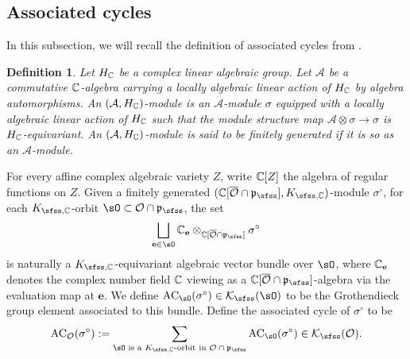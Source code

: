 \documentclass[12pt,a4paper]{amsart}
\newcommand{\CA}{{\mathcal {A}}}
\newcommand{\CK}{{\mathcal {K}}}
\newcommand{\CO}{{\mathcal {O}}}
\newcommand{\oS}{\operatorname{S}}
\newcommand{\p}{\mathfrak p}
\numberwithin{equation}{section}
\newtheorem{defn}[thm]{Definition}
\theoremstyle{remark}
\begin{document}
\subsection{Associated cycles}%

In this subsection, we will recall the definition of associated cycles from \cite{Vo89}.
\begin{defn}\label{spkmodule}
 Let $H_{\mathbb{C}}$ be a complex linear algebraic group. Let $\CA$ be a commutative $\mathbb{C}$-algebra carrying a locally algebraic linear action of $H_{\mathbb{C}}$ by algebra automorphisms.
  An $(\CA, H_\C)$-module is an  $\CA$-module
$
  \sigma
$
equipped with a locally algebraic linear action of $H_{\mathbb{C}}$ such that
the module structure map
$
  \CA\otimes \sigma\rightarrow \sigma
$
is $H_{\mathbb{C}}$-equivariant. An $(\CA, H_\C)$-module is said to be finitely generated if it is so as an $\CA$-module.

\end{defn}



For every affine complex algebraic variety $Z$, write $\mathbb{C}[Z]$ the algebra of regular functions on $Z$.
Given a finitely generated $(\C[\overline \CO\cap \p_\sfss], K_{\sfss, \C})$-module $\sigma^\circ$, for each $K_{\sfss, \C}$-orbit $\sO\subset \CO\cap \p_\sfss$, the set
\[
  \bigsqcup_{\mathbf e\in \sO} \C_\mathbf e\otimes_{\C[\overline \CO\cap \p_\sfss]}\sigma^\circ
\]
is naturally a $K_{\sfss, \C}$-equivariant algebraic vector bundle over $\sO$, where $\mathbb{C}_\mathbf e$  denotes the complex number field $\mathbb{C}$ viewing as a $\C[\overline \CO\cap \p_\sfss]$-algebra via the evaluation map at $\mathbf e$. We define $\mathrm{AC}_\sO(\sigma^\circ)\in \CK_\sfss(\sO)$ to be the Grothendieck group element associated to this bundle. Define the  associated cycle of $\sigma^\circ$ to be
\[
  \mathrm{AC}_\CO(\sigma^\circ):=\sum_{\sO\textrm{ is a   $K_{\sfss, \C}$-orbit in $ \CO\cap \p_\sfss$}} \mathrm{AC}_\sO(\sigma^\circ)\in \CK_\sfss(\CO).
\]
\end{document}
